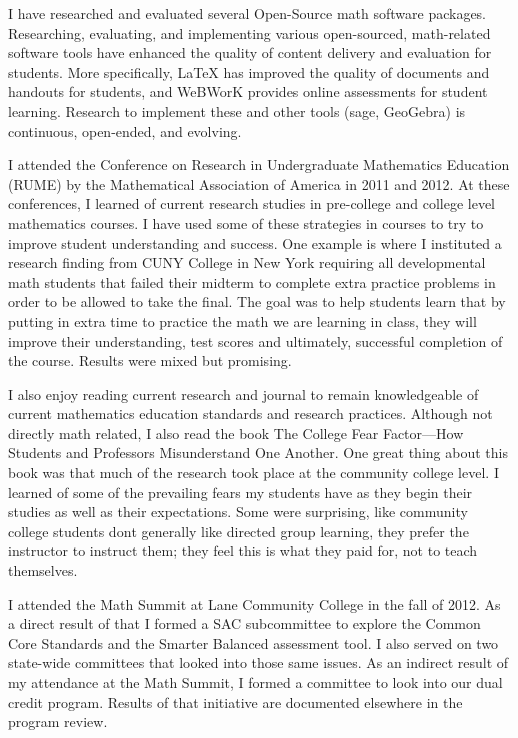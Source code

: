 \begin{description}[style=nextline]
	I have researched and evaluated several Open-Source math software packages.
	Researching, evaluating, and implementing various open-sourced, math-related
	software tools have enhanced the quality of content delivery and evaluation for
	students. More specifically, LaTeX has improved the quality of documents and
	handouts for students, and WeBWorK provides online assessments for student
	learning. Research to implement these and other tools (sage, GeoGebra) is
	continuous, open-ended, and evolving.

	\item[Rebecca Ross (Full-time Instructor, Southeast Campus)]
	I attended the Conference on Research in Undergraduate Mathematics Education
	(RUME) by the Mathematical Association of America in 2011 and 2012.  At these
	conferences, I learned of current research studies in pre-college and college
	level mathematics courses.  I have used some of these strategies in courses to
	try to improve student understanding and success.  One example is where I
	instituted a research finding from CUNY College in New York requiring all
	developmental math students that failed their midterm to complete extra
	practice problems in order to be allowed to take the final.  The goal was to
	help students learn that by putting in extra time to practice the math we are
	learning in class, they will improve their understanding, test scores and
	ultimately, successful completion of the course.  Results were mixed but
	promising.

	I also enjoy reading current research and journal to remain knowledgeable of
	current mathematics education standards and research practices.  Although not
	directly math related, I also read the book The College Fear Factor---How
	Students and Professors Misunderstand One Another.  One great thing about this
	book was that much of the research took place at the community college level.  I learned of some of the prevailing fears my students have as they begin their studies as well as their expectations.  Some were surprising, like community college students dont generally like directed group learning, they prefer the instructor to instruct them; they feel this is what they paid for, not to teach themselves.

	\item[Steve Simonds (Faculty Chair, Sylvania Campus)]
	I attended the Math Summit at Lane Community College in the fall of 2012.  As a
	direct result of that I formed a SAC subcommittee to explore the Common Core
	Standards and the Smarter Balanced assessment tool.  I also served on two
	state-wide committees that looked into those same issues.  As an indirect
	result of my attendance at the Math Summit, I formed a committee to look into
	our dual credit program.  Results of that initiative are documented elsewhere
	in the program review.


\end{description}

